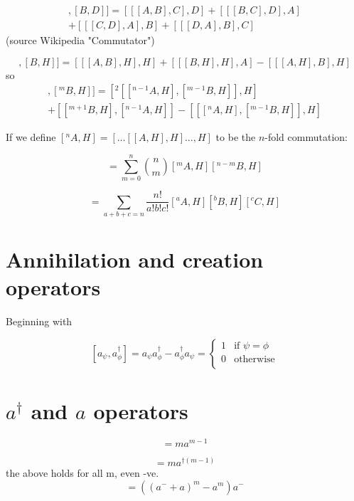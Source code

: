 \documentclass[letterpaper,10pt]{article}
\begin{document}
\begin{multline}
[[A,C],[B,D]]=[[[A,B],C],D]+[[[B,C],D],A]
\\+[[[C,D],A],B]+[[[D,A],B],C]
\end{multline}
(source Wikipedia "Commutator")

\begin{equation}
[[A,H],[B,H]]=[[[A,B],H],H]+[[[B,H],H],A]-[[[A,H],B],H]
\end{equation}
so
\begin{multline}
[[^nA,H],[^mB,H]]=[^2[[^{n-1}A,H],[^{m-1}B,H]],H]
\\+[[^{m+1}B,H],[^{n-1}A,H]]-[[[^nA,H],[^{m-1}B,H]],H]
\end{multline}


If we define $[^nA,H] = [\dots [[A,H],H] \dots ,H]$ to be the $n$-fold commutation:

\begin{equation}
[^n AB,H] = \sum_{m=0}^n {n \choose m}[^mA,H][^{n-m}B,H]
\end{equation}

\begin{equation}
[^n ABC,H] = \sum_{a+b+c = n} \frac{n!}{a!b!c!}[^aA,H][^bB,H][^cC,H]
\end{equation}

\section{Annihilation and creation operators}

Beginning with

\[
[a_\psi,a_\phi^\dag] = a_\psi a_\phi^\dag - a_\phi^\dag a_\psi = 
\begin{cases}
 1 & \text{if }\psi=\phi \\
 0 & \text{otherwise} \\
 \end{cases}
\]


\section{$a^\dag$ and $a$ operators}

\begin{equation}
[a^m, a^\dag] = ma^{m-1}
\end{equation}

\begin{equation}
[a,a^{\dag m}] = ma^{\dag(m-1)}
\end{equation}
the above holds for all m, even -ve.
\begin{equation}
[a^-,a^m] = ((a^- + a)^m - a^m)a^-
\end{equation}
\end{document}
